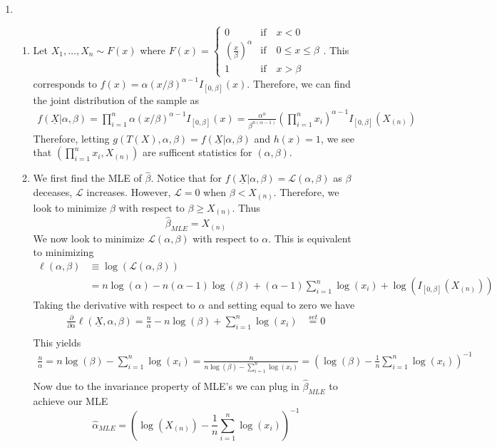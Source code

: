 \documentclass[12pt]{article}  %
\begin{document}
\begin{enumerate}
\item 
\begin{enumerate}
\item Let $X_1,\ldots, X_n \sim F(x)$ where $F(x) = \begin{cases} 0 &\text{if}\hspace{1em} x<0\\ \left(\frac{x}{\beta}\right)^{\alpha}&\text{if}\hspace{1em} 0\leq x\leq \beta\\ 1 & \text{if}\hspace{1em} x>\beta\end{cases}$. This corresponds to $f(x) = \alpha(x/\beta)^{\alpha - 1}I_{[0,\beta]}(x)$. Therefore, we can find the joint distribution of the sample as 
\begin{align*}
f(\underline{X}|\alpha,\beta) = \prod_{i=1}^{n}\alpha(x/\beta)^{\alpha - 1}I_{[0,\beta]}(x) = \frac{\alpha^n}{\beta^{n(\alpha -1)}}\left(\prod_{i=1}^n x_i\right)^{\alpha-1}I_{[0,\beta]}(X_{(n)})
\end{align*}
Therefore, letting $g(T(X), \alpha, \beta) = f(\underline{X}|\alpha, \beta)$ and $h(x) = 1$, we see that $\left(\prod_{i=1}^n x_i, X_{(n)}\right)$ are sufficent statistics for $(\alpha, \beta)$. 
\item We first find the MLE of $\hat{\beta}$. Notice that for $f(\underline{X}|\alpha,\beta) = \mathcal{L}(\alpha,\beta)$ as $\beta$ deceases, $\mathcal{L}$ increases. However, $\mathcal{L} = 0$ when $\beta<X_{(n)}$. Therefore, we look to minimize $\beta$ with respect to $\beta\geq X_{(n)}$. Thus $$\hat{\beta}_{MLE} =   X_{(n)}$$ We now look to minimize $\mathcal{L}(\alpha, \beta)$ with respect to $\alpha$. This is equivalent to minimizing 
\begin{align*}
\ell(\alpha,\beta)&\equiv \log(\mathcal{L}(\alpha,\beta))\\
&= n\log(\alpha) - n(\alpha - 1)\log(\beta) + (\alpha -1)\sum_{i=1}^{n}\log(x_i)+ \log(I_{[0,\beta]}(X_{(n)}))
\end{align*} Taking the derivative with respect to $\alpha$ and setting equal to zero we have 
\begin{align*}
\frac{\partial}{\partial\alpha}\ell(\underline{X},\alpha,\beta) = \frac{n}{\alpha} - n\log(\beta) + \sum_{i=1}^{n}\log(x_i) &\overset{set}{=}0\\
\end{align*}
This yields 
\begin{align*}
\frac{n}{\alpha} = n\log(\beta) - \sum_{i=1}^n\log(x_i) = \frac{n}{n\log(\beta) - \sum_{i=1}^n\log(x_i)} = \left(\log(\beta) - \frac{1}{n}\sum_{i=1}^n\log(x_i)\right)^{-1}\\
\end{align*}
Now due to the invariance property of MLE's we can plug in $\hat{\beta}_{MLE}$ to achieve our MLE $$\hat{\alpha}_{MLE} = \left(\log(X_{(n)}) - \frac{1}{n}\sum_{i=1}^n\log(x_i)\right)^{-1}$$


\end{enumerate}
\end{enumerate}
\end{document}
